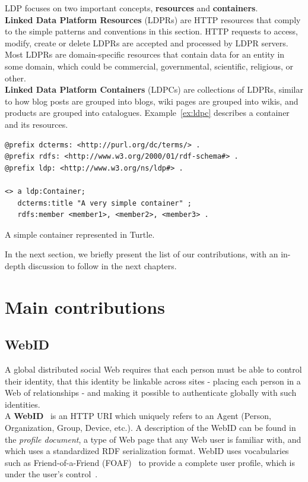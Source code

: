 LDP focuses on two important concepts, \textbf{resources} and \textbf{containers}.\\

\textbf{Linked Data Platform Resources} (LDPRs) are HTTP resources that comply to the simple patterns and conventions in this section. HTTP requests to access, modify, create or delete LDPRs are accepted and processed by LDPR servers. Most LDPRs are domain-specific resources that contain data for an entity in some domain, which could be commercial, governmental, scientific, religious, or other.\\

\textbf{Linked Data Platform Containers} (LDPCs) are collections of LDPRs, similar to how blog posts are grouped into blogs, wiki pages are grouped into wikis, and products are grouped into catalogues. Example~\ref{ex:ldpc} describes a container and its resources.\\

\begin{example}
\begin{verbatim}
@prefix dcterms: <http://purl.org/dc/terms/> .
@prefix rdfs: <http://www.w3.org/2000/01/rdf-schema#> .
@prefix ldp: <http://www.w3.org/ns/ldp#> .

<> a ldp:Container;
   dcterms:title "A very simple container" ;
   rdfs:member <member1>, <member2>, <member3> .
\end{verbatim}
\caption{A simple container represented in Turtle.}
\label{ex:ldpc}
\end{example}

In the next section, we briefly present the list of our contributions, with an in-depth discussion to follow in the next chapters.

\section{Main contributions}
\label{sec:intro-contrib}

\subsection{WebID}
A global distributed social Web requires that each person must be able to control their identity, that this identity be linkable across sites - placing each person in a Web of relationships - and making it possible to authenticate globally with such identities.\\

A \textbf{WebID}~\cite{webid2013} is an HTTP URI which uniquely refers to an Agent (Person, Organization, Group, Device, etc.). A description of the WebID can be found in the \textit{profile document}, a type of Web page that any Web user is familiar with, and which uses a standardized RDF serialization format. WebID uses vocabularies such as Friend-of-a-Friend (FOAF)~\cite{foaf} to provide a complete user profile, which is under the user's control~\cite{sambra2011myprofile}.\\

